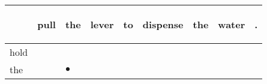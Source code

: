 \documentclass[landscape]{article}
\newcommand{\ssp}{\hspace{2pt}}
\newcommand{\mex}{\cellcolor{g}$\bullet$}
\begin{document}
\newpage

\noindent\begin{tabular}{|l|p{10pt}|p{10pt}|p{10pt}|p{10pt}|p{10pt}|p{10pt}|p{10pt}|p{10pt}|}
\hline
&\begin{sideways}\cellcolor{ref0}pull\hspace{12pt}\end{sideways}&\begin{sideways}\cellcolor{ref1}the\hspace{12pt}\end{sideways}&\begin{sideways}\cellcolor{ref2}lever\hspace{12pt}\end{sideways}&\begin{sideways}\cellcolor{ref3}to\hspace{12pt}\end{sideways}&\begin{sideways}\cellcolor{ref4}dispense\hspace{12pt}\end{sideways}&\begin{sideways}\cellcolor{ref5}the\hspace{12pt}\end{sideways}&\begin{sideways}\cellcolor{ref6}water\hspace{12pt}\end{sideways}&\begin{sideways}\cellcolor{ref7}.\hspace{12pt}\end{sideways}\\
\hline
\ssp hold \ssp&\hspace{2pt}&\hspace{2pt}&\hspace{2pt}&\hspace{2pt}&\hspace{2pt}&\hspace{2pt}&\hspace{2pt}&\hspace{2pt}\\
\hline
\ssp \cellcolor{ref1}the \ssp&\hspace{2pt}&\hspace{2pt}\mex&\hspace{2pt}&\hspace{2pt}&\hspace{2pt}&\hspace{2pt}&\hspace{2pt}&\hspace{2pt}\\

\end{tabular}
\end{document}
